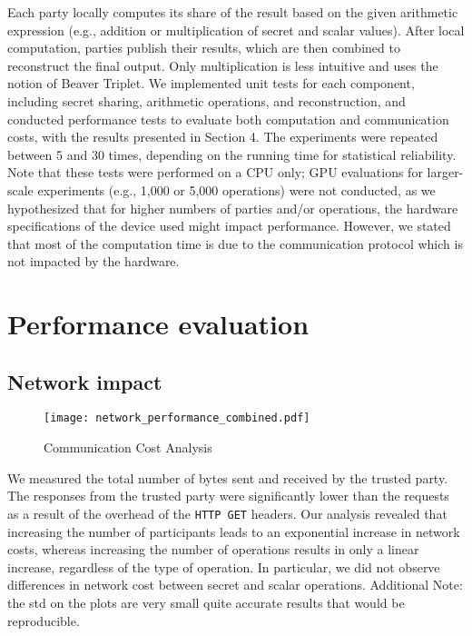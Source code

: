 \documentclass[10pt,conference,compsocconf]{IEEEtran}
\begin{document}
Each party locally computes its share of the result based on the given arithmetic expression (e.g., addition or multiplication of secret and scalar values). After local computation, parties publish their results, which are then combined to reconstruct the final output. Only multiplication is less intuitive and uses the notion of Beaver Triplet.
 We implemented unit tests for each component, including secret sharing, arithmetic operations, and reconstruction, and conducted performance tests to evaluate both computation and communication costs, with the results presented in Section 4. The experiments were repeated between 5 and 30 times, depending on the running time for statistical reliability. Note that these tests were performed on a CPU only; GPU evaluations for larger-scale experiments (e.g., 1,000 or 5,000 operations) were not conducted, as we hypothesized that for higher numbers of parties and/or operations, the hardware specifications of the device used might impact performance. However, we stated that most of the computation time is due to the communication protocol which is not impacted by the hardware.

\section{Performance evaluation}

\subsection{Network impact}

\begin{figure}[H]
    \centering
    \texttt{[image: network\_performance\_combined.pdf]}
    \caption{\small{Communication Cost Analysis}}
    \label{fig:enter-label}
\end{figure}


We measured the total number of bytes sent and received by the trusted party. The responses from the trusted party were significantly lower than the requests as a result of the overhead of the \texttt{HTTP GET} headers. Our analysis revealed that increasing the number of participants leads to an exponential increase in network costs, whereas increasing the number of operations results in only a linear increase, regardless of the type of operation. In particular, we did not observe differences in network cost between secret and scalar operations. Additional Note: the std on the plots are very small quite accurate results that would be reproducible.
\end{document}
